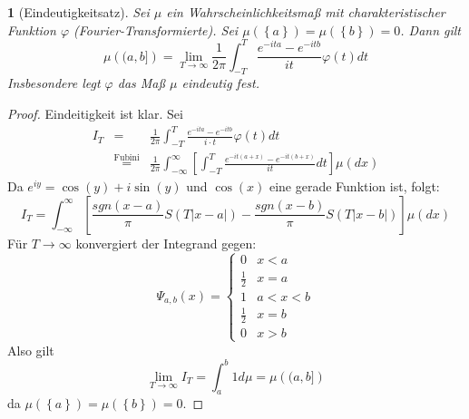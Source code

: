 \documentclass[10pt,a4paper]{report}
\numberwithin{equation}{section}
\numberwithin{figure}{section}
\theoremstyle{plain}
\theoremstyle{definition}
\theoremstyle{remark}
\theoremstyle{plain}
\newtheorem{prop}[thm]{\protect\propositionname}
\providecommand{\propositionname}{Satz}
\newcommand{\1}{ \mathbb{1} } %
\begin{document}
\begin{prop}[Eindeutigkeitsatz] 
  Sei $\mu$ ein Wahrscheinlichkeitsmaß mit charakteristischer Funktion
  $\varphi$ (Fourier-Transformierte). Sei $\mu\left(\left\{ a\right\} \right)=\mu\left(\left\{ b\right\} \right)=0$.
  Dann gilt
  \[
  \mu\left((a,b]\right)=\lim_{T\to\infty}\frac{1}{2\pi}\int_{-T}^{T}\frac{e^{-ita}-e^{-itb}}{it}\varphi\left(t\right)dt
  \]
  Insbesondere legt $\varphi$ das Maß $\mu$ eindeutig fest. 
\end{prop}
\begin{proof}
  Eindeitigkeit ist klar. Sei 
  \begin{eqnarray*}
    I_{T} & = & \frac{1}{2\pi}\int_{-T}^{T}\frac{e^{-ita}-e^{-itb}}{i\cdot t}\varphi(t)dt\\
    & \overset{\mbox{Fubini}}{=} & \frac{1}{2\pi}\int_{-\infty}^{\infty}\left[\int_{-T}^{T}\frac{e^{-it\left(a+x\right)}-e^{-it\left(b+x\right)}}{it}dt\right]\mu\left(dx\right)
  \end{eqnarray*}
  Da $e^{iy}=\cos\left(y\right)+i\sin\left(y\right)$ und $\cos\left(x\right)$
  eine gerade Funktion ist, folgt: 
  \[
  I_{T}=\int_{-\infty}^{\infty}\left[\frac{sgn\left(x-a\right)}{\pi}S\left(T\left|x-a\right|\right)-\frac{sgn\left(x-b\right)}{\pi}S\left(T\left|x-b\right|\right)\right]\mu\left(dx\right)
  \]
  Für $T\to\infty$ konvergiert der Integrand gegen: 
  \[
  \Psi_{a,b}\left(x\right)=\begin{cases}
    0 & x<a\\
    \frac{1}{2} & x=a\\
    1 & a<x<b\\
    \frac{1}{2} & x=b\\
    0 & x>b
  \end{cases}
  \]
  Also gilt 
  \[
  \lim_{T\to\infty}I_{T}=\int_{a}^{b}1d\mu=\mu\left((a,b]\right)
  \]
  da $\mu\left(\left\{ a\right\} \right)=\mu\left(\left\{ b\right\} \right)=0$. 
\end{proof}


\printindex
\end{document}
